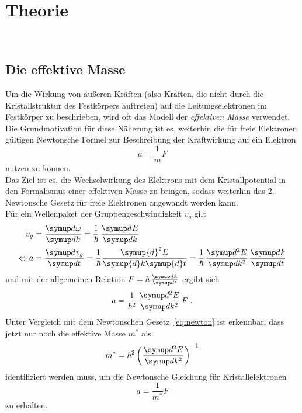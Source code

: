 \section{Theorie}
~\label{sec:Theorie}

\subsection{Die effektive Masse}

Um die Wirkung von äußeren Kräften (also Kräften, die nicht durch die Kristallstruktur des Festkörpers auftreten) auf die Leitungselektronen im Festkörper zu beschrieben, wird oft das Modell der \textit{effektiven Masse} verwendet. \\

Die Grundmotivation für diese Näherung ist es, weiterhin die für freie Elektronen gültigen Newtonsche Formel zur Beschreibung der Kraftwirkung auf ein Elektron 
\begin{equation}
    a = \frac{1}{m} F
    \label{eq:newton}
\end{equation}
nutzen zu können. \\
Das Ziel ist es, die Wechselwirkung des Elektrons mit dem Kristallpotential in den Formalismus einer effektiven Masse zu bringen, sodass weiterhin das 2. Newtonsche Gesetz für freie Elektronen angewandt werden kann. \\

Für ein Wellenpaket der Gruppengeschwindigkeit $v_g$ gilt 
\begin{align}
    v_g &= \dif{\omega}{k} =  \frac{1}{\hbar} \dif{E}{k} \\
    \Leftrightarrow a &= \dif{v_g}{t} = \frac{1}{\hbar} \frac{\symup{d}^2 E}{\symup{d}k\symup{d}t} = \frac{1}{\hbar} \dif{E}{k}[2] \dif{k}{t} 
\end{align}
und mit der allgemeinen Relation $F = \hbar \dif{k}{t}$ ergibt sich 
\begin{equation}
    a = \frac{1}{\hbar^2} \dif{E}{k}[2] F \; .
\end{equation}
Unter Vergleich mit dem Newtonschen Gesetz~\eqref{eq:newton} ist erkennbar, dass jetzt nur noch die effektive Masse $m^*$ als 
\begin{equation}
    m^* = \hbar^2 \left(\dif{E}{k}[2]\right)^{-1}
    \label{eq:effektive_masse}
\end{equation}
identifiziert werden muss, um die Newtonsche Gleichung für Kristallelektronen 
\begin{equation}
    a = \frac{1}{m^*}F
\end{equation}
zu erhalten. \\


